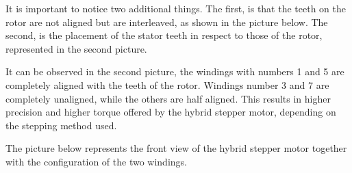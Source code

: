 It is important to notice two additional things. The first, is that the teeth on the rotor are not aligned but are interleaved, as shown in the picture below. The second, is the placement of the stator teeth in respect to those of the rotor, represented in the second picture.

\begin{figure}[htp]
    \centering
    \hfill
\end{figure}

It can be observed in the second picture, the windings with numbers 1 and 5 are completely aligned with the teeth of the rotor. Windings number 3 and 7 are completely unaligned, while the others are half aligned. This results in higher precision and higher torque offered by the hybrid stepper motor, depending on the stepping method used.

The picture below represents the front view of the hybrid stepper motor together with the configuration of the two windings.

